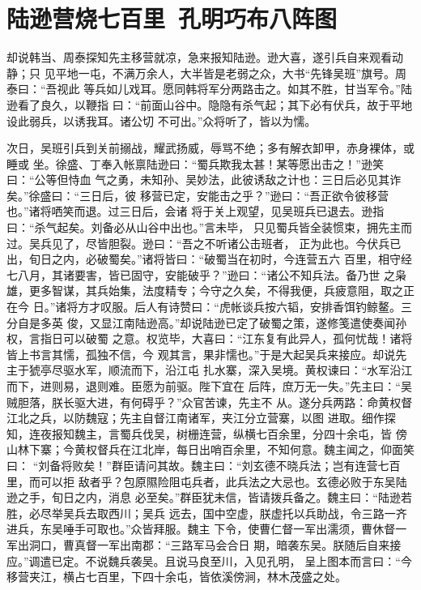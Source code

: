 \chapter{陆逊营烧七百里~孔明巧布八阵图}

却说韩当、周泰探知先主移营就凉，急来报知陆逊。逊大喜，遂引兵自来观看动静；只
见平地一屯，不满万余人，大半皆是老弱之众，大书“先锋吴班”旗号。周泰曰：“吾视此
等兵如儿戏耳。愿同韩将军分两路击之。如其不胜，甘当军令。”陆逊看了良久，以鞭指
曰：“前面山谷中。隐隐有杀气起；其下必有伏兵，故于平地设此弱兵，以诱我耳。诸公切
不可出。”众将听了，皆以为懦。

次日，吴班引兵到关前搦战，耀武扬威，辱骂不绝；多有解衣卸甲，赤身裸体，或睡或
坐。徐盛、丁奉入帐禀陆逊曰：“蜀兵欺我太甚！某等愿出击之！”逊笑曰：“公等但恃血
气之勇，未知孙、吴妙法，此彼诱敌之计也：三日后必见其诈矣。”徐盛曰：“三日后，彼
移营已定，安能击之乎？”逊曰：“吾正欲令彼移营也。”诸将哂笑而退。过三日后，会诸
将于关上观望，见吴班兵已退去。逊指曰：“杀气起矣。刘备必从山谷中出也。”言未毕，
只见蜀兵皆全装惯束，拥先主而过。吴兵见了，尽皆胆裂。逊曰：“吾之不听诸公击班者，
正为此也。今伏兵已出，旬日之内，必破蜀矣。”诸将皆曰：“破蜀当在初时，今连营五六
百里，相守经七八月，其诸要害，皆已固守，安能破乎？”逊曰：“诸公不知兵法。备乃世
之枭雄，更多智谋，其兵始集，法度精专；今守之久矣，不得我便，兵疲意阻，取之正在今
日。”诸将方才叹服。后人有诗赞曰：“虎帐谈兵按六韬，安排香饵钓鲸鳌。三分自是多英
俊，又显江南陆逊高。”却说陆逊已定了破蜀之策，遂修笺遣使奏闻孙权，言指日可以破蜀
之意。权览毕，大喜曰：“江东复有此异人，孤何忧哉！诸将皆上书言其懦，孤独不信，今
观其言，果非懦也。”于是大起吴兵来接应。却说先主于猇亭尽驱水军，顺流而下，沿江屯
扎水寨，深入吴境。黄权谏曰：“水军沿江而下，进则易，退则难。臣愿为前驱。陛下宜在
后阵，庶万无一失。”先主曰：“吴贼胆落，朕长驱大进，有何碍乎？”众官苦谏，先主不
从。遂分兵两路：命黄权督江北之兵，以防魏寇；先主自督江南诸军，夹江分立营寨，以图
进取。细作探知，连夜报知魏主，言蜀兵伐吴，树栅连营，纵横七百余里，分四十余屯，皆
傍山林下寨；今黄权督兵在江北岸，每日出哨百余里，不知何意。魏主闻之，仰面笑曰：
“刘备将败矣！”群臣请问其故。魏主曰：“刘玄德不晓兵法；岂有连营七百里，而可以拒
敌者乎？包原隰险阻屯兵者，此兵法之大忌也。玄德必败于东吴陆逊之手，旬日之内，消息
必至矣。”群臣犹未信，皆请拨兵备之。魏主曰：“陆逊若胜，必尽举吴兵去取西川；吴兵
远去，国中空虚，朕虚托以兵助战，令三路一齐进兵，东吴唾手可取也。”众皆拜服。魏主
下令，使曹仁督一军出濡须，曹休督一军出洞口，曹真督一军出南郡：“三路军马会合日
期，暗袭东吴。朕随后自来接应。”调遣已定。不说魏兵袭吴。且说马良至川，入见孔明，
呈上图本而言曰：“今移营夹江，横占七百里，下四十余屯，皆依溪傍涧，林木茂盛之处。
